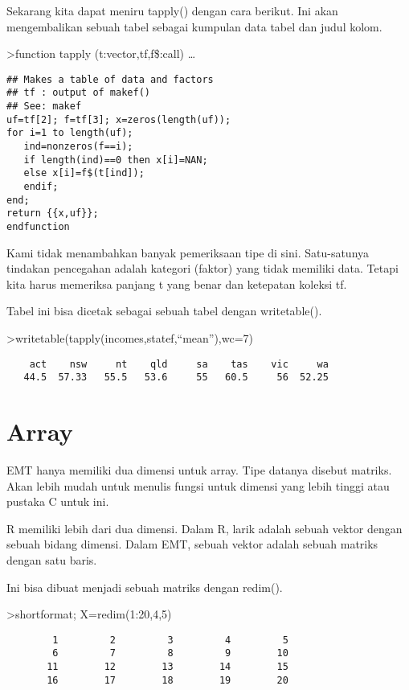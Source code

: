 \documentclass[
]{book}
\begin{document}
Sekarang kita dapat meniru tapply() dengan cara berikut. Ini akan mengembalikan sebuah tabel sebagai kumpulan data tabel dan judul kolom.

\textgreater function tapply (t:vector,tf,f\$:call) \ldots{}

\begin{verbatim}
## Makes a table of data and factors
## tf : output of makef()
## See: makef
uf=tf[2]; f=tf[3]; x=zeros(length(uf));
for i=1 to length(uf);
   ind=nonzeros(f==i);
   if length(ind)==0 then x[i]=NAN;
   else x[i]=f$(t[ind]);
   endif;
end;
return {{x,uf}};
endfunction
\end{verbatim}

Kami tidak menambahkan banyak pemeriksaan tipe di sini. Satu-satunya tindakan pencegahan adalah kategori (faktor) yang tidak memiliki data. Tetapi kita harus memeriksa panjang t yang benar dan ketepatan koleksi tf.

Tabel ini bisa dicetak sebagai sebuah tabel dengan writetable().

\textgreater writetable(tapply(incomes,statef,``mean''),wc=7)

\begin{verbatim}
    act    nsw     nt    qld     sa    tas    vic     wa
   44.5  57.33   55.5   53.6     55   60.5     56  52.25
\end{verbatim}

\chapter{Array}\label{array}

EMT hanya memiliki dua dimensi untuk array. Tipe datanya disebut matriks. Akan lebih mudah untuk menulis fungsi untuk dimensi yang lebih tinggi atau pustaka C untuk ini.

R memiliki lebih dari dua dimensi. Dalam R, larik adalah sebuah vektor dengan sebuah bidang dimensi. Dalam EMT, sebuah vektor adalah sebuah matriks dengan satu baris.

Ini bisa dibuat menjadi sebuah matriks dengan redim().

\textgreater shortformat; X=redim(1:20,4,5)

\begin{verbatim}
        1         2         3         4         5 
        6         7         8         9        10 
       11        12        13        14        15 
       16        17        18        19        20 
\end{verbatim}
\end{document}
